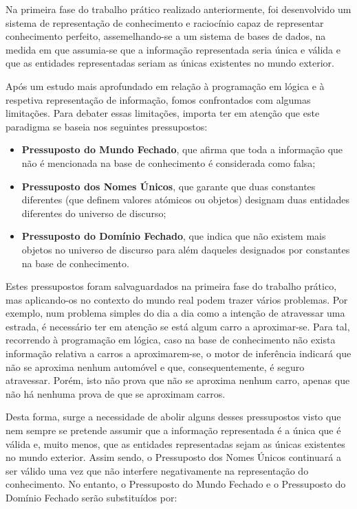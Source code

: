 \documentclass[a4paper, 11pt]{article}
\begin{document}
Na primeira fase do trabalho prático realizado anteriormente, foi desenvolvido um sistema de 
representação de conhecimento e raciocínio capaz de representar conhecimento perfeito, 
assemelhando-se a um sistema de bases de dados, na
medida em que assumia-se que a informação representada seria única e válida e que as
entidades representadas seriam as únicas existentes no mundo exterior.

Após um estudo mais aprofundado em relação à programação em lógica e à respetiva 
representação de informação, fomos confrontados com algumas limitações. Para debater essas 
limitações, importa ter em
atenção que este paradigma se baseia nos seguintes pressupostos:

\begin{itemize}
    \item \textbf{Pressuposto do Mundo Fechado}, que afirma que toda a informação que não é 
mencionada na base de conhecimento é considerada como falsa;
    \item \textbf{Pressuposto dos Nomes Únicos}, que garante que duas constantes diferentes (que 
definem valores atómicos ou objetos) designam duas entidades diferentes do universo de discurso;
    \item \textbf{Pressuposto do Domínio Fechado}, que indica que não existem mais objetos no 
universo de discurso para além daqueles designados por constantes na base de conhecimento.
\end{itemize}

Estes pressupostos foram salvaguardados na primeira fase do trabalho prático, mas aplicando-os
no contexto do mundo real podem trazer vários problemas. Por exemplo, num problema
simples do dia a dia como a intenção de atravessar uma estrada, é necessário ter em atenção
se está algum carro a aproximar-se. Para tal, recorrendo à programação em lógica, caso na
base de conhecimento não exista informação relativa a carros a aproximarem-se, o
motor de inferência indicará que não se aproxima nenhum automóvel e que,
consequentemente, é seguro atravessar. Porém, isto não prova que não se aproxima
nenhum carro, apenas que não há nenhuma prova de que se aproximam carros.

Desta forma, surge a necessidade de abolir alguns desses pressupostos visto que nem sempre
se pretende assumir que a informação representada é a única que é válida e, muito menos,
que as entidades representadas sejam as únicas existentes no mundo exterior.
Assim sendo, o Pressuposto dos Nomes Únicos continuará a ser válido uma vez que não interfere 
negativamente na representação do conhecimento. No entanto, o Pressuposto do Mundo Fechado e o 
Pressuposto do Domínio Fechado serão substituídos por:
\end{document}
